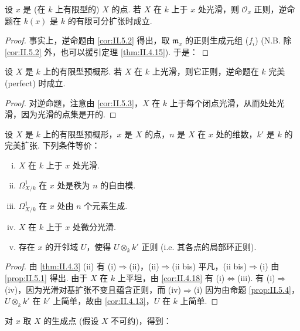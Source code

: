 \begin{corollary}\label{cor:II.5.3}
设 $x$ 是 (在 $k$ 上有限型的) $X$ 的点. 若 $X$ 在 $k$ 上于 $x$ 处光滑，则 $\mathcal{O}_x$ 正则，逆命题在 $k(x)$ 是 $k$ 的有限可分扩张时成立.
\end{corollary}

\begin{proof}
事实上，逆命题由 \ref{cor:II.5.2} 得出，取 $\mathfrak{m}_x$ 的正则生成元组 ($f_i$) (N.B. 除 \ref{cor:II.5.2} 外，也可以援引定理 \ref{thm:II.4.15}). 于是：
\end{proof}

\begin{proposition}\label{prop:II.5.4}
设 $X$ 是 $k$ 上的有限型预概形. 若 $X$ 在 $k$ 上光滑，则它正则，逆命题在 $k$ 完美 (perfect) 时成立.
\end{proposition}

\begin{proof}
对逆命题，注意由 \ref{cor:II.5.3}，$X$ 在 $k$ 上于每个闭点光滑，从而处处光滑，因为光滑的点集是开的.
\end{proof}

\begin{theorem}\label{thm:II.5.5}
设 $X$ 是 $k$ 上的有限型预概形，$x$ 是 $X$ 的点，$n$ 是 $X$ 在 $x$ 处的维数，$k'$ 是 $k$ 的完美扩张. 下列条件等价：
\begin{enumerate}[(i)]
\item $X$ 在 $k$ 上于 $x$ 处光滑.
\item $\varOmega_{X/k}^{1}$ 在 $x$ 处是秩为 $n$ 的自由模.
\item[(ii bis)] $\varOmega_{X/k}^{1}$ 在 $x$ 处由 $n$ 个元素生成.
\item $X$ 在 $k$ 上于 $x$ 处微分光滑.
\item 存在 $x$ 的开邻域 $U$，使得 $U \otimes_k k'$ 正则 (i.e. 其各点的局部环正则).
\end{enumerate}
\end{theorem}

\begin{proof}
由 \ref{thm:II.4.3} (ii) 有 (i)$\Rightarrow$(ii)，(ii)$\Rightarrow$(ii bis) 平凡，(ii bis)$\Rightarrow$(i) 由 \ref{prop:II.5.1} 得出. 由于 $X$ 在 $k$ 上平坦，由 \ref{cor:II.4.18} 有 (i)$\Leftrightarrow$(iii). 有 (i)$\Rightarrow$(iv)，因为光滑对基扩张不变且蕴含正则，而 (iv)$\Rightarrow$(i) 因为由命题 \ref{prop:II.5.4}，$U \otimes_k k'$ 在 $k'$ 上简单，故由 \ref{cor:II.4.13}，$U$ 在 $k$ 上简单.
\end{proof}

对 $x$ 取 $X$ 的生成点 (假设 $X$ 不可约)，得到：

